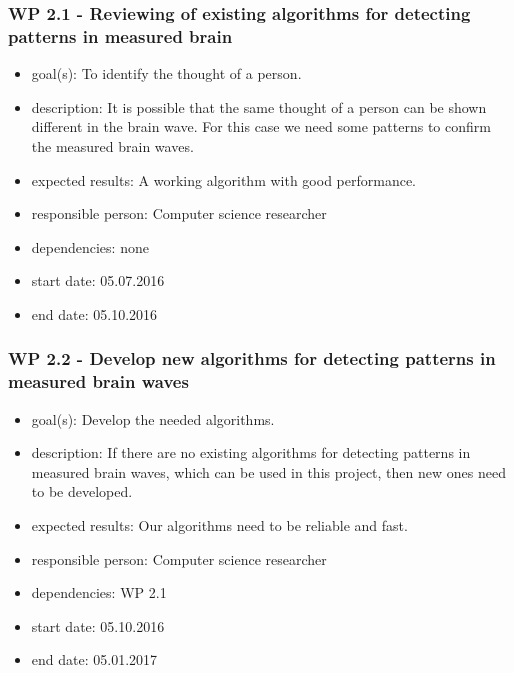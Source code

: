 \subsubsection*{WP 2.1 - Reviewing of existing algorithms for detecting patterns in measured brain}
\begin{itemize}
 \item goal(s): To identify the thought of a person.
 \item description: It is possible that the same thought of a person can be shown different in the brain wave. For this case we need some patterns to confirm the measured brain waves.
 \item expected results: A working algorithm with good performance.
 \item responsible person: Computer science researcher
 \item dependencies: none
 \item start date: 05.07.2016
 \item end date: 05.10.2016
\end{itemize}

\subsubsection*{WP 2.2 - Develop new algorithms for detecting patterns in measured brain waves}
\begin{itemize}
 \item goal(s):  Develop the needed algorithms.
 \item description: If there are no existing algorithms for detecting patterns in measured brain waves, which can be used in this project, then new ones need to be developed.
 \item expected results: Our algorithms need to be reliable and fast.
 \item responsible person: Computer science researcher
 \item dependencies: WP 2.1 
 \item start date: 05.10.2016
 \item end date: 05.01.2017
\end{itemize}


